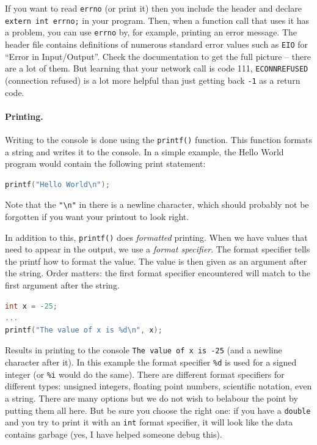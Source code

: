 If you want to read \texttt{errno} (or print it) then you include the header and declare \texttt{extern int errno;}  in your program. Then, when a function call that uses it has a problem, you can use \texttt{errno} by, for example, printing an error message. The header file contains definitions of numerous standard error values such as \texttt{EIO} for ``Error in Input/Output''. Check the documentation to get the full picture -- there are a lot of them. But learning that your network call is code 111, \texttt{ECONNREFUSED} (connection refused) is a lot more helpful than just getting back \texttt{-1} as a return code.


\paragraph{Printing.}

Writing to the console is done using the \texttt{printf()} function. This function formats a string and writes it to the console. In a simple example, the Hello World program would contain the following print statement:

\begin{lstlisting}[language=C]
printf("Hello World\n");
\end{lstlisting}

Note that the \texttt{"\textbackslash n"} in there is a newline character, which should probably not be forgotten if you want your printout to look right.

In addition to this, \texttt{printf()} does \textit{formatted} printing. When we have values that need to appear in the output, we use a \textit{format specifier}. The format specifier tells the printf how to format the value. The value is then given as an argument after the string. Order matters: the first format specifier encountered will match to the first argument after the string.

\begin{lstlisting}[language=C]
int x = -25;
...
printf("The value of x is %d\n", x);
\end{lstlisting}

Results in printing to the console \texttt{The value of x is -25} (and a newline character after it). In this example the format specifier \texttt{\%d} is used for a signed integer (or \texttt{\%i} would do the same). There are different format specifiers for different types: unsigned integers, floating point numbers, scientific notation, even a string. There are many options but we do not wish to belabour the point by putting them all here. But be sure you choose the right one: if you have a \texttt{double} and you try to print it with an \texttt{int} format specifier, it will look like the data contains garbage (yes, I have helped someone debug this).

